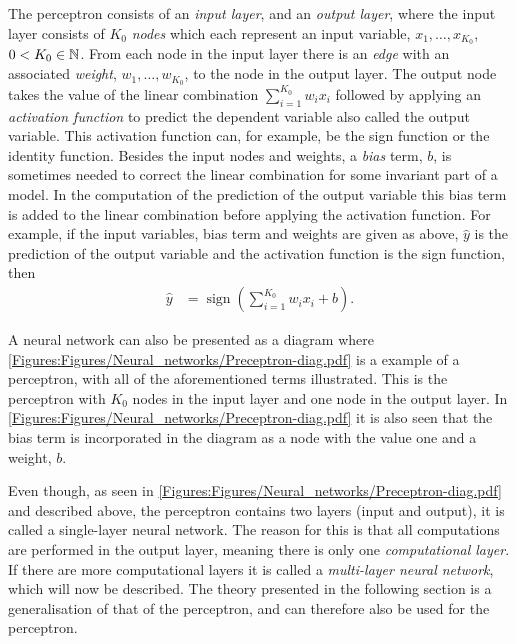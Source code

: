 The perceptron consists of an \emph{input layer}, and an \emph{output layer}, where the input layer consists of $K_0$ \emph{nodes} which each represent an input variable, $x_1, \ldots, x_{K_0}$, $0 < K_0 \in \mathbb{N}$. From each node in the input layer there is an \emph{edge} with an associated \emph{weight}, $w_1, \ldots, w_{K_0}$, to the node in the output layer. The output node takes the value of the linear combination $\sum_{i = 1}^{K_0} w_ix_i$ followed by applying an \emph{activation function} to predict the dependent variable also called the output variable. This activation function can, for example, be the sign function or the identity function. Besides the input nodes and weights, a \emph{bias} term, $b$, is sometimes needed to correct the linear combination for some invariant part of a model. In the computation of the prediction of the output variable this bias term is added to the linear combination before applying the activation function. For example, if the input variables, bias term and weights are given as above, $\hat{y}$ is the prediction of the output variable and the activation function is the sign function, then
\begin{align}\label{eq:sign_perceptron_output}
    \hat{y} &=  \operatorname{sign}\left(\sum_{i=1}^{K_0} w_ix_i + b\right).
\end{align}
 
A neural network can also be presented as a diagram where \autoref{Figures:Figures/Neural_networks/Preceptron-diag.pdf} is a example of a perceptron, with all of the aforementioned terms illustrated. This is the perceptron with $K_0$ nodes in the input layer and one node in the output layer. In \autoref{Figures:Figures/Neural_networks/Preceptron-diag.pdf} it is also seen that the bias term is incorporated in the diagram as a node with the value one and a weight, $b$.

Even though, as seen in \autoref{Figures:Figures/Neural_networks/Preceptron-diag.pdf} and described above, the perceptron contains two layers (input and output), it is called a single-layer neural network. The reason for this is that all computations are performed in the output layer, meaning there is only one \emph{computational layer}. If there are more computational layers it is called a \emph{multi-layer neural network}, which will now be described. The theory presented in the following section is a generalisation of that of the perceptron, and can therefore also be used for the perceptron. 


